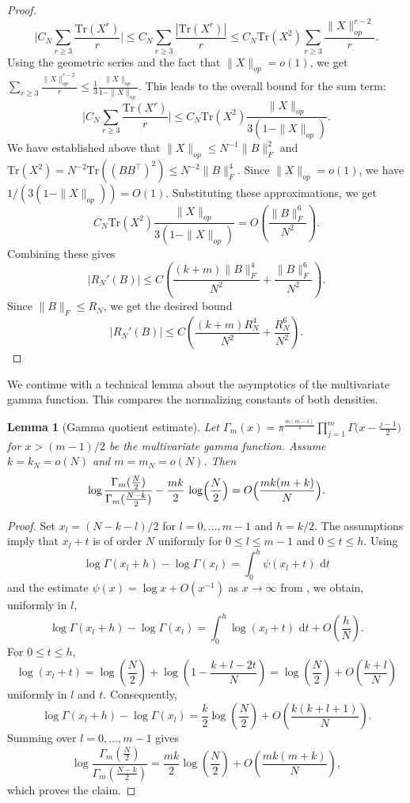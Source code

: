 \documentclass[11pt,a4paper,twoside]{article}
\newcommand{\dint}{\,\mathrm{d}}
\newtheorem{lemma}[thm]{Lemma}
\theoremstyle{definition}
\begin{document}
\begin{proof}
	$$\Big|C_N \sum_{r\ge3}\frac{\mathrm{Tr}(X^r)}{r}\Big| \le C_N \sum_{r\ge3}\frac{|\mathrm{Tr}(X^r)|}{r} \le C_N \mathrm{Tr}(X^2) \sum_{r\ge3}\frac{\|X\|_{op}^{r-2}}{r}.$$
	Using the geometric series and the fact that \(\|X\|_{op} =o(1)\), we get \(\sum_{r\ge3}\frac{\|X\|_{op}^{r-2}}{r} \le \frac{1}{3} \frac{\|X\|_{op}}{1-\|X\|_{op}}\).
	This leads to the overall bound for the sum term:
	$$ \Big|C_N \sum_{r\ge3}\frac{\mathrm{Tr}(X^r)}{r}\Big| \le C_N \mathrm{Tr}(X^2) \frac{\|X\|_{op}}{3(1-\|X\|_{op})}. $$
	We have established above that \(\|X\|_{op} \le N^{-1}\|B\|_F^2\) and \(\mathrm{Tr}(X^2) = N^{-2}\mathrm{Tr}((BB^\top)^2) \le N^{-2}\|B\|_F^4\). Since \(\|X\|_{op}=o(1)\), we have \(1/(3(1-\|X\|_{op})) = O(1)\). Substituting these approximations, we get
	$$ C_N \mathrm{Tr}(X^2) \frac{\|X\|_{op}}{3(1-\|X\|_{op})} =  O\left(\frac{\|B\|_F^6}{N^2}\right). $$
	Combining these gives
	$$ |R_N'(B)| \le C \left(\frac{(k+m)\|B\|_F^4}{N^2} + \frac{\|B\|_F^6}{N^2}\right). $$
	Since \(\|B\|_F \le R_N\), we get the desired bound
	$$ |R_N'(B)| \le C \left(\frac{(k+m)R_N^4}{N^2} + \frac{R_N^6}{N^2}\right). $$
	\end{proof}

	We continue with a technical lemma about the asymptotics of the multivariate gamma function. This compares the normalizing constants of both densities. 

	\begin{lemma}[Gamma quotient estimate]
		\label{lem:gamma_quotient}
		Let \(\Gamma_m(x) = \pi^{\frac{m(m-1)}4}\prod_{j=1}^m\Gamma\bigl(x-\frac{j-1}2\bigr)\) for $x > (m-1)/2$ be the multivariate gamma function. Assume \(k = k_N = o(N)\) and \(m = m_N = o(N)\). Then
		\[
		\log\frac{\Gamma_m(\frac N2)}{\Gamma_m(\frac{N-k}2)}
		  - \frac{mk}{2}\,\log\Bigl(\frac N2\Bigr)
		= O\Bigl(\frac{mk(m+k)}{N}\Bigr).
		\]
		\end{lemma}

		\begin{proof}
			Set $x_l=(N-k-l)/2$ for $l=0,\ldots,m-1$ and $h=k/2$. The assumptions imply that $x_l+t$ is of order $N$ uniformly for $0\le l\le m-1$ and $0\le t\le h$. Using
			\[
			\log\Gamma(x_l+h)-\log\Gamma(x_l)=\int_0^h\psi(x_l+t)\,\dint t
			\]
			and the estimate $\psi(x)=\log x+O(x^{-1})$ as $x\to\infty$ from \cite[Section 5.11]{lozier2003nist}, we obtain, uniformly in $l$,
			\[
			\log\Gamma(x_l+h)-\log\Gamma(x_l)
			=\int_0^h\log(x_l+t)\,\dint t+O\left(\frac{h}{N}\right).
			\]
			For $0\le t\le h$,
			\[
			\log(x_l+t)
			=\log\left(\frac{N}{2}\right)
			+\log\left(1-\frac{k+l-2t}{N}\right)
			=\log\left(\frac{N}{2}\right)+O\left(\frac{k+l}{N}\right)
			\]
			uniformly in $l$ and $t$. Consequently,
			\[
			\log\Gamma(x_l+h)-\log\Gamma(x_l)
			=\frac{k}{2}\log\left(\frac{N}{2}\right)
			+O\left(\frac{k(k+l+1)}{N}\right).
			\]
			Summing over $l=0,\ldots,m-1$ gives
			\[
			\log\frac{\Gamma_m(\frac{N}{2})}{\Gamma_m(\frac{N-k}{2})}
			=\frac{mk}{2}\log\left(\frac{N}{2}\right)
			+O\left(\frac{mk(m+k)}{N}\right),
			\]
			which proves the claim.
		\end{proof}
\end{document}

